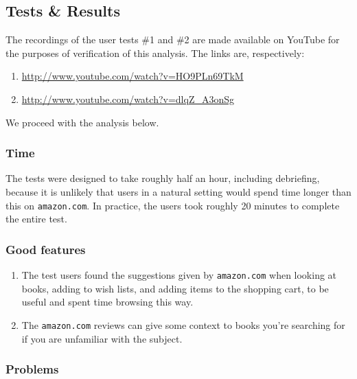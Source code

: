 \subsection{Tests \& Results}

The recordings of the user tests \#1 and \#2 are made available on YouTube for
the purposes of verification of this analysis. The links are, respectively:

\begin{enumerate}

\item \url{http://www.youtube.com/watch?v=HO9PLn69TkM}

\item \url{http://www.youtube.com/watch?v=dlqZ_A3onSg}

\end{enumerate}

We proceed with the analysis below.

\subsubsection{Time}

The tests were designed to take roughly half an hour, including debriefing,
because it is unlikely that users in a natural setting would spend time longer
than this on \texttt{amazon.com}. In practice, the users took roughly 20
minutes to complete the entire test.

\subsubsection{Good features}

\begin{enumerate}

\item The test users found the suggestions given by \texttt{amazon.com} when
looking at books, adding to wish lists, and adding items to the shopping cart,
to be useful and spent time browsing this way.

\item The \texttt{amazon.com} reviews can give some context to books you're
searching for if you are unfamiliar with the subject.

\end{enumerate}

\subsubsection{Problems}


